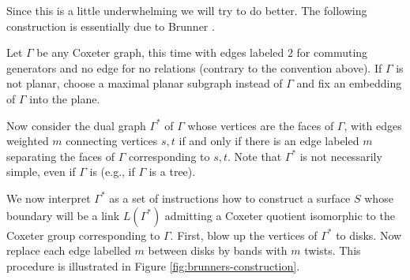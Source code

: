 \documentclass{article}
\theoremstyle{definition}
\begin{document}
Since this is a little underwhelming we will try to do better. The following construction is essentially due to Brunner \cite{brunner1992}.

Let $\Gamma$ be any Coxeter graph, this time with edges labeled $2$ for commuting generators and no edge for no relations (contrary to the convention above). If $\Gamma$ is not planar, choose a maximal planar subgraph instead of $\Gamma$ and fix an embedding of $\Gamma$ into the plane.

Now consider the dual graph $\Gamma^*$ of $\Gamma$ whose vertices are the faces of $\Gamma$, with edges weighted $m$ connecting vertices $s, t$ if and only if there is an edge labeled $m$ separating the faces of $\Gamma$ corresponding to $s, t$. Note that $\Gamma^*$ is not necessarily simple, even if $\Gamma$ is (e.g., if $\Gamma$ is a tree).

We now interpret $\Gamma^*$ as a set of instructions how to construct a surface $S$ whose boundary will be a link $L(\Gamma^*)$ admitting a Coxeter quotient isomorphic to the Coxeter group corresponding to $\Gamma$. First, blow up the vertices of $\Gamma^*$ to disks. Now replace each edge labelled $m$ between disks by bands with $m$ twists. This procedure is illustrated in Figure \ref{fig:brunners-construction}.
\end{document}
